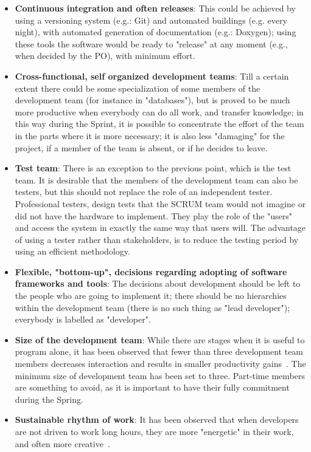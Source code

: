 \documentclass[11pt]{article} %
\begin{document}
\begin{itemize}
\item \textbf{Continuous integration and often releases}: This could be achieved by using a versioning system (e.g.: Git) and automated buildings (e.g. every night), with automated generation of documentation (e.g.: Doxygen); using these tools the software would be ready to "release" at any moment (e.g., when decided by the PO), with minimum effort.
\item \textbf{Cross-functional, self organized development teams}: Till a certain extent there could be some specialization of some members of the development team (for instance in "databases"), but is proved to be much more productive when everybody can do all work, and transfer knowledge; in this way during the Sprint, it is possible to concentrate the effort of the team in the parts where it is more necessary; it is also less "damaging" for the project, if a member of the team is absent, or if he decides to leave.
\item \textbf{Test team}: There is an exception to the previous point, which is the test team. It is desirable that the members of the development team can also be testers, but this should not replace the role of an independent tester. Professional testers, design tests that the SCRUM team would not imagine or did not have the hardware to implement. They play the role of the "users" and access the system in exactly the same way that users will. The advantage of using a tester rather than stakeholders, is to reduce the testing period by using an efficient methodology.
\item \textbf{Flexible, "bottom-up", decisions regarding adopting of software frameworks and tools}: The decisions about development should be left to the people who are going to implement it; there should be no hierarchies within the development team (there is no such thing as "lead developer"); everybody is labelled as "developer".
\item \textbf{Size of the development team}: While there are stages when it is useful to program alone, it has been observed that fewer than three development team members decreases interaction and results in smaller productivity gains~\cite{scrum}. The minimum size of development team has been set to three. Part-time members are something to avoid, as it is important to have their fully commitment during the Spring.
\item \textbf{Sustainable rhythm of work}: It has been observed that when developers are not driven to work long hours, they are more "energetic" in their work, and often more creative~\cite{xp}.

\end{itemize}
\end{document}
